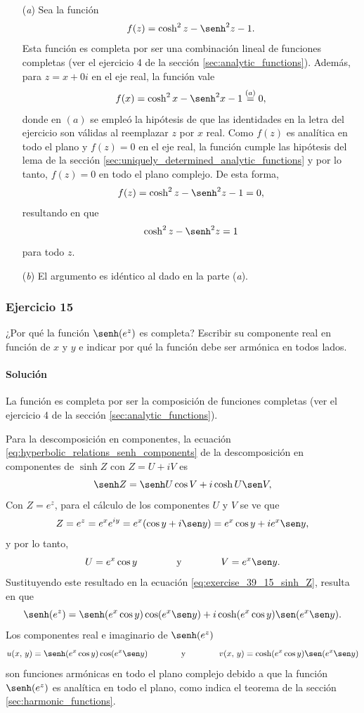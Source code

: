 \documentclass[a4paper]{report}
\begin{document}
\begin{enumerate}
 \item[(\textit{a})] Sea la función 
 \[
  f(z)=\cosh^2z-\senh^2z-1.
 \]
 Esta función es completa por ser una combinación lineal de funciones completas (ver el ejercicio 4 de la sección \ref{sec:analytic_functions}). Además, para \(z=x+0i\) en el eje real, la función vale
 \[
  f(x)=\cosh^2x-\senh^2x-1\overset{(a)}{=}0,
 \]
 donde en \((a)\) se empleó la hipótesis de que las identidades en la letra del ejercicio son válidas al reemplazar \(z\) por \(x\) real. Como \(f(z)\) es analítica en todo el plano y \(f(z)=0\) en el eje real, la función cumple las hipótesis del lema de la sección \ref{sec:uniquely_determined_analytic_functions} y por lo tanto, \(f(z)=0\) en todo el plano complejo. De esta forma,
 \[
  f(z)=\cosh^2z-\senh^2z-1=0,
 \]
 resultando en que 
 \[
  \cosh^2z-\senh^2z=1
 \]
 para todo \(z\).
 \item[(\textit{b})] El argumento es idéntico al dado en la parte (\textit{a}).
\end{enumerate}

\subsubsection{Ejercicio 15}

¿Por qué la función \(\senh(e^z)\) es completa? Escribir su componente real en función de \(x\) y \(y\) e indicar por qué la función debe ser armónica en todos lados.

\paragraph{Solución} La función es completa por ser la composición de funciones completas (ver el ejercicio 4 de la sección \ref{sec:analytic_functions}).

Para la descomposición en componentes, la ecuación \ref{eq:hyperbolic_relations_senh_components} de la descomposición en componentes de \(\sinh Z\) con \(Z=U+iV\) es
\begin{equation}\label{eq:exercise_39_15_sinh_Z}
 \senh Z=\senh U\cos V+i\cosh U\sen V,
\end{equation}
Con \(Z=e^z\), para el cálculo de los componentes \(U\) y \(V\) se ve que 
\[
 Z=e^z=e^xe^{iy}=e^x(\cos y+i\sen y)=e^x\cos y+ie^x\sen y,
\]
y por lo tanto,
\[
 U=e^x\cos y
 \qquad\qquad\textrm{y}\qquad\qquad
 V=e^x\sen y.
\]
Sustituyendo este resultado en la ecuación \ref{eq:exercise_39_15_sinh_Z}, resulta en que 
\[
 \senh(e^z)=\senh(e^x\cos y)\cos(e^x\sen y)+i\cosh(e^x\cos y)\sen(e^x\sen y).
\]
Los componentes real e imaginario de \(\senh(e^z)\)
\[
 u(x,\,y)=\senh(e^x\cos y)\cos(e^x\sen y)
 \qquad\qquad\textrm{y}\qquad\qquad
 v(x,\,y)=\cosh(e^x\cos y)\sen(e^x\sen y)
\]
son funciones armónicas en todo el plano complejo debido a que la función \(\senh(e^z)\) es analítica en todo el plano, como indica el teorema de la sección \ref{sec:harmonic_functions}.
\end{document}

